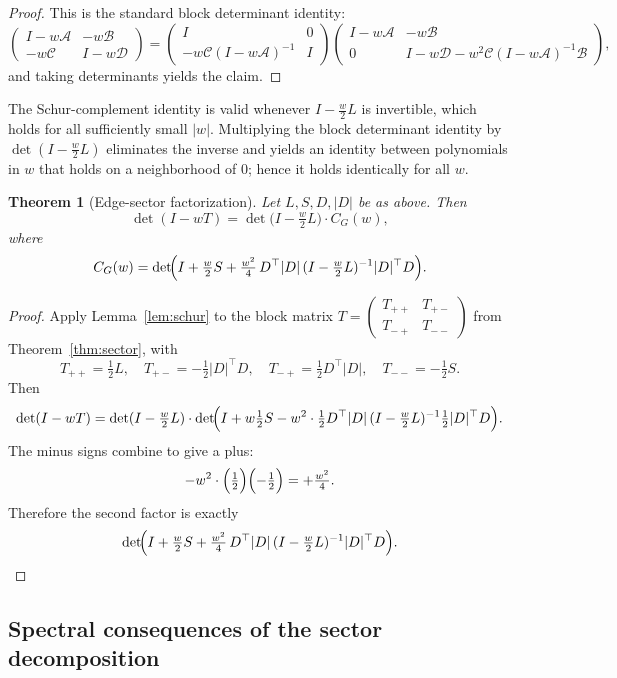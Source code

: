 \documentclass[11pt]{article}
\newtheorem{theorem}{Theorem}
\begin{document}
\begin{proof}
This is the standard block determinant identity:
\[
\begin{pmatrix}I-w\mathcal A & -w\mathcal B\\ -w\mathcal C & I-w\mathcal D\end{pmatrix}
=
\begin{pmatrix}I & 0\\ -w\mathcal C(I-w\mathcal A)^{-1} & I\end{pmatrix}
\begin{pmatrix}I-w\mathcal A & -w\mathcal B\\ 0 & I-w\mathcal D-w^2\mathcal C(I-w\mathcal A)^{-1}\mathcal B\end{pmatrix},
\]
and taking determinants yields the claim.
\end{proof}
The Schur-complement identity is valid whenever $I-\frac{w}{2}L$ is invertible, which holds for all sufficiently small $|w|$.
Multiplying the block determinant identity by $\det(I-\tfrac w2 L)$ eliminates the inverse and yields an identity between polynomials in $w$
that holds on a neighborhood of $0$; hence it holds identically for all $w$.
\begin{theorem}[Edge-sector factorization]\label{thm:factor}
Let $L,S,D,|D|$ be as above. Then
\[
\det(I-wT)=\det\!\bigl(I-\tfrac w2 L\bigr)\cdot C_G(w),
\]
where
\[
C_G(w)=\det\!\Bigl(I+\tfrac w2 S+\tfrac{w^2}{4}\,D^\top|D|\,(I-\tfrac w2 L)^{-1}|D|^\top D\Bigr).
\]
\end{theorem}

\begin{proof}
Apply Lemma~\ref{lem:schur} to the block matrix $T=\begin{pmatrix}T_{++} & T_{+-}\\ T_{-+} & T_{--}\end{pmatrix}$
from Theorem~\ref{thm:sector}, with
\[
T_{++}=\tfrac12 L,\quad T_{+-}=-\tfrac12|D|^\top D,\quad T_{-+}=\tfrac12 D^\top|D|,\quad T_{--}=-\tfrac12 S.
\]
Then
\[
\det(I-wT)=\det(I-\tfrac w2 L)\cdot \det\!\Bigl(I+w\tfrac12 S - w^2\cdot \tfrac12 D^\top|D|\,(I-\tfrac w2 L)^{-1}\tfrac12|D|^\top D\Bigr).
\]
The minus signs combine to give a plus:
\[
-w^2\cdot\Bigl(\tfrac12\Bigr)\Bigl(-\tfrac12\Bigr)=+\tfrac{w^2}{4}.
\]
Therefore the second factor is exactly
\[
\det\!\Bigl(I+\tfrac w2 S+\tfrac{w^2}{4}\,D^\top|D|\,(I-\tfrac w2 L)^{-1}|D|^\top D\Bigr).
\]
\end{proof}

\subsection{Spectral consequences of the sector decomposition}\label{subsec:spectral-consequences}
\end{document}
